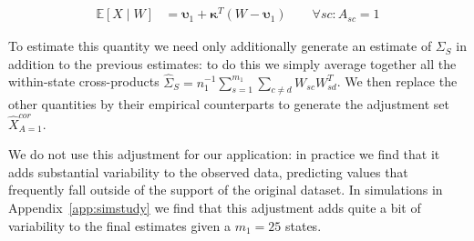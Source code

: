 \begin{align*}
    \mathbb{E}[X \mid W] &=  \boldsymbol{\upsilon}_1 + \boldsymbol{\kappa}^T(W - \boldsymbol{\upsilon}_1) \qquad \forall sc: A_{sc} = 1
\end{align*}

To estimate this quantity we need only additionally generate an estimate of $\Sigma_{S}$ in addition to the previous estimates: to do this we simply average together all the within-state cross-products $\hat{\Sigma}_{S} = n_1^{-1}\sum_{s=1}^{m_1}\sum_{c\ne d}W_{sc}W_{sd}^T$. We then replace the other quantities by their empirical counterparts to generate the adjustment set $\hat{X}_{A=1}^{cor}$.

We do not use this adjustment for our application: in practice we find that it adds substantial variability to the observed data, predicting values that frequently fall outside of the support of the original dataset. In simulations in Appendix~\ref{app:simstudy} we find that this adjustment adds quite a bit of variability to the final estimates given a $m_1 = 25$ states. 